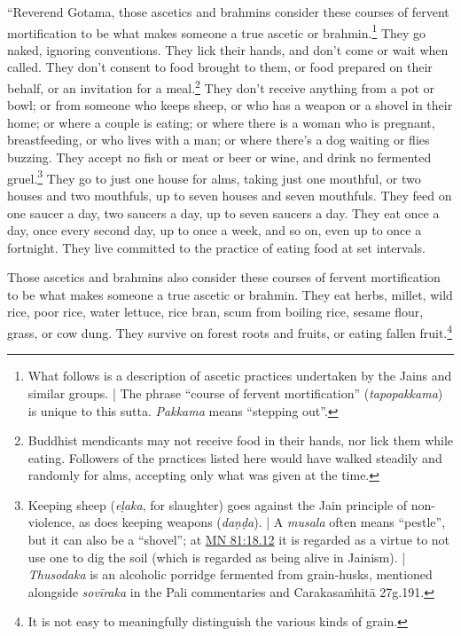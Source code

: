 \documentclass[12pt,openany]{book}%
\begin{document}
“Reverend Gotama, those ascetics and brahmins consider these courses of fervent mortification to be what makes someone a true ascetic or brahmin.\footnote{What follows is a description of ascetic practices undertaken by the Jains and similar groups. | The phrase “course of fervent mortification” (\textit{tapopakkama}) is unique to this sutta. \textit{Pakkama} means “stepping out”. } They go naked, ignoring conventions. They lick their hands, and don’t come or wait when called. They don’t consent to food brought to them, or food prepared on their behalf, or an invitation for a meal.\footnote{Buddhist mendicants may not receive food in their hands, nor lick them while eating. Followers of the practices listed here would have walked steadily and randomly for alms, accepting only what was given at the time. } They don’t receive anything from a pot or bowl; or from someone who keeps sheep, or who has a weapon or a shovel in their home; or where a couple is eating; or where there is a woman who is pregnant, breastfeeding, or who lives with a man; or where there’s a dog waiting or flies buzzing. They accept no fish or meat or beer or wine, and drink no fermented gruel.\footnote{Keeping sheep (\textit{\textsanskrit{eḷaka}}, for slaughter) goes against the Jain principle of non-violence, as does keeping weapons (\textit{\textsanskrit{daṇḍa}}). | A \textit{musala} often means “pestle”, but it can also be a “shovel”; at \href{https://suttacentral.net/mn81/en/sujato\#18.12}{MN 81:18.12} it is regarded as a virtue to not use one to dig the soil (which is regarded as being alive in Jainism). | \textit{Thusodaka} is an alcoholic porridge fermented from grain-husks, mentioned alongside \textit{\textsanskrit{sovīraka}} in the Pali commentaries and \textsanskrit{Carakasaṁhitā} 27g.191. } They go to just one house for alms, taking just one mouthful, or two houses and two mouthfuls, up to seven houses and seven mouthfuls. They feed on one saucer a day, two saucers a day, up to seven saucers a day. They eat once a day, once every second day, up to once a week, and so on, even up to once a fortnight. They live committed to the practice of eating food at set intervals. 

Those ascetics and brahmins also consider these courses of fervent mortification to be what makes someone a true ascetic or brahmin. They eat herbs, millet, wild rice, poor rice, water lettuce, rice bran, scum from boiling rice, sesame flour, grass, or cow dung. They survive on forest roots and fruits, or eating fallen fruit.\footnote{It is not easy to meaningfully distinguish the various kinds of grain. } 
\end{document}

